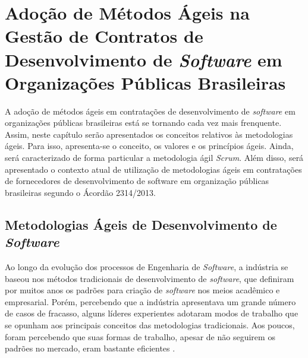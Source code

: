 

\chapter[Adoção de Métodos Ágeis na Gestão de Contratos de Desenvolvimento de \textit{Software} em Organizações Públicas Brasileiras]{Adoção de Métodos Ágeis na Gestão de Contratos de Desenvolvimento de \textit{Software} em Organizações Públicas Brasileiras}

A adoção de métodos ágeis em contratações de desenvolvimento de \textit{software} em organizações públicas brasileiras está se tornando cada vez mais frenquente. Assim,  neste capítulo serão apresentados os conceitos relativos às metodologias ágeis. Para isso, apresenta-se o conceito, os valores e os princípios ágeis. Ainda, será caracterizado de forma particular a metodologia ágil \textit{Scrum}. Além disso, será apresentado o contexto atual de utilização de metodologias ágeis em contratações de fornecedores de desenvolvimento de software em organização públicas brasileiras segundo o Ácordão 2314/2013.

\section[Metodologias Ágeis de Desenvolvimento de \textit{Software}]{Metodologias Ágeis de Desenvolvimento de \textit{Software}}

Ao longo da evolução dos processos de Engenharia de \textit{Software}, a indústria se baseou nos métodos tradicionais de desenvolvimento de \textit{software}, que definiram por muitos anos os padrões para criação de \textit{software} nos meios acadêmico e empresarial. Porém, percebendo que a indústria apresentava um grande número de casos de fracasso, alguns líderes experientes adotaram modos de trabalho que se opunham aos principais conceitos das metodologias tradicionais. Aos poucos, foram percebendo que suas formas de trabalho, apesar de não seguirem os padrões no mercado, eram bastante eficientes   \cite{filho}. 

